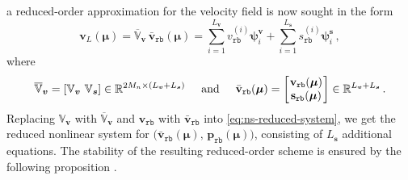 \documentclass[12pt, a4paper, twoside, openright]{report}
\numberwithin{equation}{chapter}
\theoremstyle{theorem}
\theoremstyle{definition}
\theoremstyle{remark}
\theoremstyle{proposition}
\numberwithin{figure}{chapter}
\newcommand{\bg}[1]{\boldsymbol{#1}}
\begin{document}
		a reduced-order approximation for the velocity field is now sought in the form
		\begin{equation}
			\mathbf{v}_L(\bg{\mu}) = \overline{\mathbb{V}}_{\bg{v}} \, \bar{\mathbf{v}}_{\texttt{rb}}(\bg{\mu}) = \sum_{i = 1}^{L_{\bg{v}}} v_{\texttt{rb}}^{(i)} \bg{\psi}_i^{\bg{v}} + \sum_{i = 1}^{L_{\bg{s}}} s_{\texttt{rb}}^{(i)} \bg{\psi}_i^{\bg{s}} \, ,
		\end{equation} 
		where
		\begin{equation*}
			\overline{\mathbb{V}}_{\bg{v}} = \left[ \mathbb{V}_{\bg{v}} ~ \mathbb{V}_{\bg{s}} \right] \in \mathbb{R}^{2 M_n \times (L_{\bg{v}} + L_{\bg{s}})} \hspace*{0.5cm} \text{and} \hspace*{0.5cm} \bar{\mathbf{v}}_{\texttt{rb}}(\bg{\mu}) =
			\begin{bmatrix}
			\hspace*{-0.15cm}
			\begin{array}{c}
				\mathbf{v}_{\texttt{rb}}(\bg{\mu}) \\
				\mathbf{s}_{\texttt{rb}}(\bg{\mu})
			\end{array} 
			\hspace*{-0.15cm}
			\end{bmatrix} 
			\in \mathbb{R}^{L_{\bg{v}} + L_{\bg{s}}} \, .
		\end{equation*}
		Replacing $\mathbb{V}_{\bg{v}}$ with $\overline{\mathbb{V}}_{\bg{v}}$ and $\mathbf{v}_{\texttt{rb}}$ with $\bar{\mathbf{v}}_{\texttt{rb}}$ into \eqref{eq:ns-reduced-system}, we get the reduced nonlinear system for $\big( \bar{\mathbf{v}}_{\texttt{rb}}(\bg{\mu}), \, \mathbf{p}_{\texttt{rb}}(\bg{\mu}) \big)$, consisting of $L_{\bg{s}}$ additional equations. The stability of the resulting reduced-order scheme is ensured by the following proposition \cite{Bal14}. 
		
\end{document}

